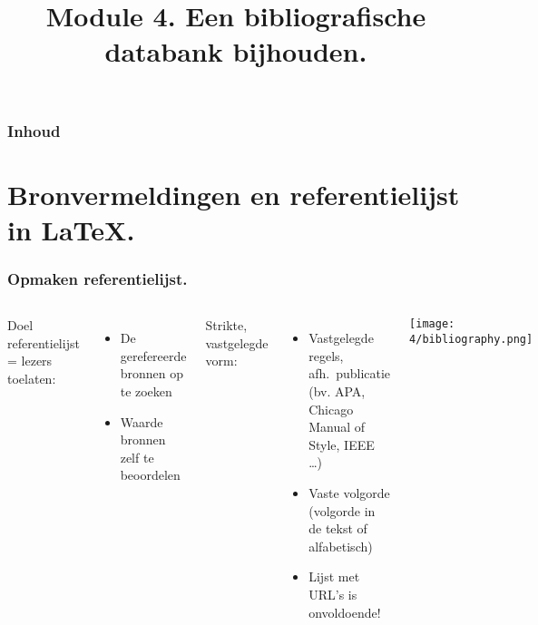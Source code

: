 \documentclass[aspectratio=169]{beamer}
\title{Module 4. Een bibliografische databank bijhouden.}
\subtitle{\coursename}
\author{\lecturers}   %
\date{\academicyear}
\begin{document}
\begin{frame}
  \maketitle
\end{frame}

\begin{frame}
  \frametitle{Inhoud}

  \tableofcontents
\end{frame}

\section{Bronvermeldingen en referentielijst in {\LaTeX}.}

\begin{frame}[plain]
  \frametitle{Opmaken referentielijst.}
	
	
	\begin{columns}[c]
		
  		Doel referentielijst = lezers toelaten:
  		
  		
  		\begin{itemize}
  			\item De gerefereerde bronnen op te zoeken
  			\item Waarde bronnen zelf te beoordelen
  		\end{itemize}
  		
  		{\pause}
  		
  		Strikte, vastgelegde vorm:
  		
  		\begin{itemize}
  			\item Vastgelegde regels, afh.~publicatie (bv. APA, Chicago Manual of Style, IEEE \ldots)
  			\item Vaste volgorde (volgorde in de tekst of alfabetisch)
  			\item Lijst met URL's is onvoldoende!
  		\end{itemize}
  		
  		{\pause}
 		
		\begin{center}
			\texttt{[image: 4/bibliography.png]}
		\end{center}
		
	\end{columns}


{\pause}


\end{frame}
\end{document}
